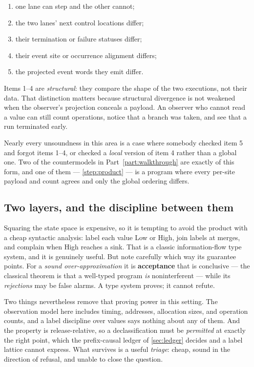 \begin{enumerate}[nosep,leftmargin=1.6em]
\item one lane can step and the other cannot;
\item the two lanes' next control locations differ;
\item their termination or failure statuses differ;
\item their event site or occurrence alignment differs;
\item the projected event words they emit differ.
\end{enumerate}

Items 1--4 are \emph{structural}: they compare the shape of the two executions,
not their data. That distinction matters because structural divergence is not
weakened when the observer's projection conceals a payload. An observer who
cannot read a value can still count operations, notice that a branch was taken,
and see that a run terminated early.

\begin{remark}
Nearly every unsoundness in this area is a case where somebody checked item 5
and forgot items 1--4, or checked a \emph{local} version of item 4 rather than a
global one. Two of the countermodels in Part~\ref{part:walkthrough} are exactly
of this form, and one of them --- \cref{step:product} --- is a program where
every per-site payload and count agrees and only the global ordering differs.
\end{remark}

\subsection{Two layers, and the discipline between them}

Squaring the state space is expensive, so it is tempting to avoid the product
with a cheap syntactic analysis: label each value \textsf{Low} or \textsf{High},
join labels at merges, and complain when \textsf{High} reaches a sink. That is a
classic information-flow type system, and it is genuinely useful. But note
carefully which way its guarantee points. For a \emph{sound over-approximation}
it is \textbf{acceptance} that is conclusive --- the classical theorem is that a
well-typed program \emph{is} noninterferent --- while its \emph{rejections} may
be false alarms. A type system proves; it cannot refute.

Two things nevertheless remove that proving power in this setting. The
observation model here includes timing, addresses, allocation sizes, and
operation counts, and a label discipline over values says nothing about any of
them. And the property is release-relative, so a declassification must be
\emph{permitted} at exactly the right point, which the prefix-causal ledger of
\cref{sec:ledger} decides and a label lattice cannot express. What survives is a
useful \emph{triage}: cheap, sound in the direction of refusal, and unable to
close the question.


